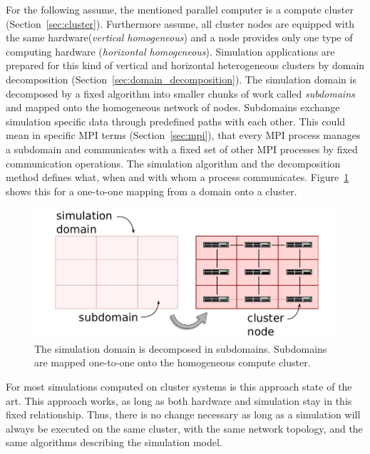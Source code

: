 For the following assume, the mentioned parallel computer is a compute
cluster (Section~\ref{sec:cluster}). Furthermore assume, all cluster
nodes are equipped with the same hardware(\emph{vertical homogeneous})
and a node provides only one type of computing hardware
(\emph{horizontal homogeneous}). Simulation applications are prepared
for this kind of vertical and horizontal heterogeneous clusters by
domain decomposition (Section~\ref{sec:domain_decomposition}). The
simulation domain is decomposed by a fixed algorithm into smaller
chunks of work called \emph{subdomains} and mapped onto the
homogeneous network of nodes. Subdomains exchange simulation specific
data through predefined paths with each other. This could mean in
specific MPI terms (Section~\ref{sec:mpi}), that every MPI process
manages a subdomain and communicates with a fixed set of other MPI
processes by fixed communication operations. The simulation algorithm
and the decomposition method defines what, when and with whom a
process communicates.  Figure~\ref{fig:state_of_the_art} shows this
for a one-to-one mapping from a domain onto a cluster.

\begin{figure}[H]
  \centering \includegraphics[width=\textwidth]{graphics/30_state_of_the_art}
  \caption{The simulation domain is decomposed in
    subdomains. Subdomains are mapped one-to-one onto the homogeneous
    compute cluster.}
  \label{fig:state_of_the_art}
\end{figure}

\noindent For most simulations computed on cluster systems is this approach
state of the art.  This approach works, as long as both hardware and
simulation stay in this fixed relationship. Thus, there is no change
necessary as long as a simulation will always be executed on the same
cluster, with the same network topology, and the same algorithms
describing the simulation model.

